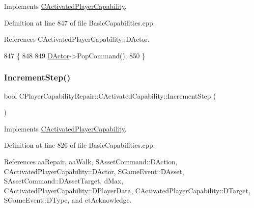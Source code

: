 Implements \hyperlink{classCActivatedPlayerCapability_a5cde83be468e262ad054d81e28684a81}{C\+Activated\+Player\+Capability}.



Definition at line 847 of file Basic\+Capabilities.\+cpp.



References C\+Activated\+Player\+Capability\+::\+D\+Actor.


\begin{DoxyCode}
847                                                         \{
848 
849     \hyperlink{classCActivatedPlayerCapability_a54ca944b47bff2718330639941d402b0}{DActor}->PopCommand();
850 \}
\end{DoxyCode}
\hypertarget{classCPlayerCapabilityRepair_1_1CActivatedCapability_a5b5b42dbbda50b29e9f917df3cb0f650}{}\label{classCPlayerCapabilityRepair_1_1CActivatedCapability_a5b5b42dbbda50b29e9f917df3cb0f650} 
\subsubsection{\texorpdfstring{Increment\+Step()}{IncrementStep()}}
{\footnotesize\ttfamily bool C\+Player\+Capability\+Repair\+::\+C\+Activated\+Capability\+::\+Increment\+Step (\begin{DoxyParamCaption}{ }\end{DoxyParamCaption})\hspace{0.3cm}{\ttfamily [virtual]}}



Implements \hyperlink{classCActivatedPlayerCapability_a943b5999a57504399293250382c0ec6a}{C\+Activated\+Player\+Capability}.



Definition at line 826 of file Basic\+Capabilities.\+cpp.



References aa\+Repair, aa\+Walk, S\+Asset\+Command\+::\+D\+Action, C\+Activated\+Player\+Capability\+::\+D\+Actor, S\+Game\+Event\+::\+D\+Asset, S\+Asset\+Command\+::\+D\+Asset\+Target, d\+Max, C\+Activated\+Player\+Capability\+::\+D\+Player\+Data, C\+Activated\+Player\+Capability\+::\+D\+Target, S\+Game\+Event\+::\+D\+Type, and et\+Acknowledge.


